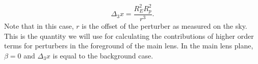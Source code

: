 \begin{equation}
\Delta_3 x = \frac{R_E^2 R_p^2}{r^3}.
\end{equation}
Note that in this case, $r$ is the offset of the perturber as measured on the sky. This is the quantity we will use for calculating the contributions of higher order terms for perturbers in the foreground of the main lens. In the main lens plane, $\beta = 0$ and $\Delta_3 x$ is equal to the background case.
  